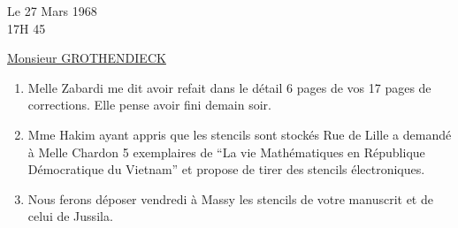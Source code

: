 \begin{flushright}
Le 27 Mars 1968\\
17H 45\\
\end{flushright}

\begin{center}
\uline{Monsieur GROTHENDIECK}\\
\end{center}

\begin{enumerate}[label=\arabic*.]
\item Melle Zabardi me dit avoir refait dans le détail 6 pages de vos 17 pages de corrections. Elle pense avoir fini demain soir.

\item Mme Hakim ayant appris que les stencils sont stockés Rue de Lille a demandé à Melle Chardon 5 exemplaires de ``La vie Mathématiques en République Démocratique du Vietnam'' et propose de tirer des stencils électroniques.

\item Nous ferons déposer vendredi à Massy les stencils de votre manuscrit et de celui de Jussila.
\end{enumerate}

